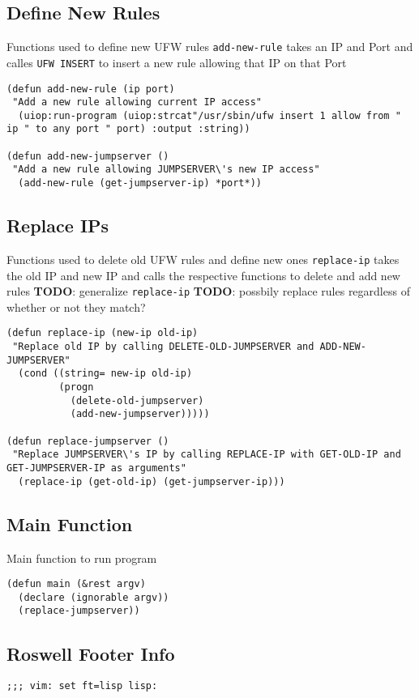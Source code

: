 \documentclass[11pt]{article}
\begin{document}
\subsection{Define New Rules}
\label{sec:orga66b748}
Functions used to define new UFW rules
\texttt{add-new-rule} takes an IP and Port and calles \texttt{UFW INSERT} to insert a new rule allowing that IP on that Port

\begin{verbatim}
(defun add-new-rule (ip port)
 "Add a new rule allowing current IP access"
  (uiop:run-program (uiop:strcat"/usr/sbin/ufw insert 1 allow from " ip " to any port " port) :output :string))

(defun add-new-jumpserver ()
 "Add a new rule allowing JUMPSERVER\'s new IP access"
  (add-new-rule (get-jumpserver-ip) *port*))

\end{verbatim}

\subsection{Replace IPs}
\label{sec:orgb7097c6}
Functions used to delete old UFW rules and define new ones
\texttt{replace-ip} takes the old IP and new IP and calls the respective functions to delete and add new rules
\textbf{TODO}: generalize \texttt{replace-ip}
\textbf{TODO}: possbily replace rules regardless of whether or not they match?

\begin{verbatim}
(defun replace-ip (new-ip old-ip)
 "Replace old IP by calling DELETE-OLD-JUMPSERVER and ADD-NEW-JUMPSERVER"
  (cond ((string= new-ip old-ip)
         (progn
           (delete-old-jumpserver)
           (add-new-jumpserver)))))

(defun replace-jumpserver ()
 "Replace JUMPSERVER\'s IP by calling REPLACE-IP with GET-OLD-IP and GET-JUMPSERVER-IP as arguments"
  (replace-ip (get-old-ip) (get-jumpserver-ip)))

\end{verbatim}

\subsection{Main Function}
\label{sec:orgee89016}
Main function to run program

\begin{verbatim}
(defun main (&rest argv)
  (declare (ignorable argv))
  (replace-jumpserver))

\end{verbatim}

\subsection{Roswell Footer Info}
\label{sec:orgcd4ee00}
\begin{verbatim}
;;; vim: set ft=lisp lisp:
\end{verbatim}
\end{document}
